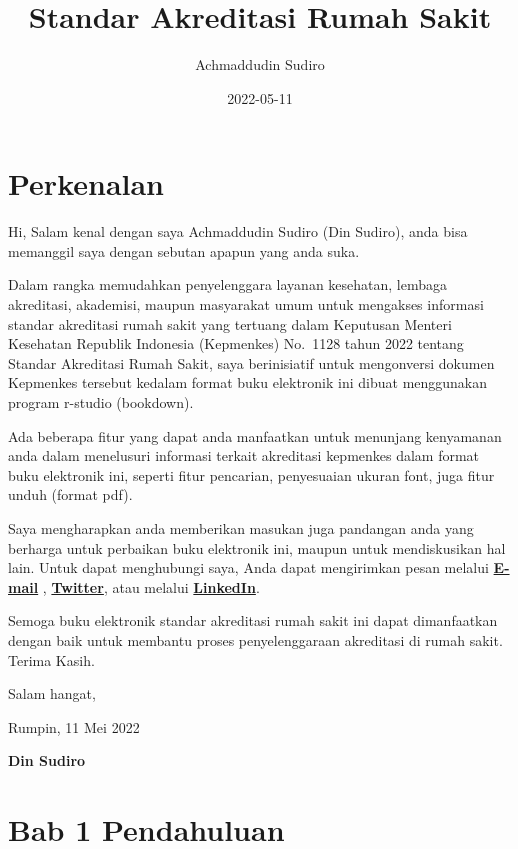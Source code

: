 \documentclass[
]{book}
\title{Standar Akreditasi Rumah Sakit}
\author{Achmaddudin Sudiro}
\date{2022-05-11}
\begin{document}
\maketitle

{
\setcounter{tocdepth}{1}
\tableofcontents
}
\hypertarget{perkenalan}{%
\chapter*{Perkenalan}\label{perkenalan}}

Hi, Salam kenal dengan saya Achmaddudin Sudiro (Din Sudiro), anda bisa memanggil saya dengan sebutan apapun yang anda suka.

Dalam rangka memudahkan penyelenggara layanan kesehatan, lembaga akreditasi, akademisi, maupun masyarakat umum untuk mengakses informasi standar akreditasi rumah sakit yang tertuang dalam Keputusan Menteri Kesehatan Republik Indonesia (Kepmenkes) No.~1128 tahun 2022 tentang Standar Akreditasi Rumah Sakit, saya berinisiatif untuk mengonversi dokumen Kepmenkes tersebut kedalam format buku elektronik ini dibuat menggunakan program r-studio (bookdown).

Ada beberapa fitur yang dapat anda manfaatkan untuk menunjang kenyamanan anda dalam menelusuri informasi terkait akreditasi kepmenkes dalam format buku elektronik ini, seperti fitur pencarian, penyesuaian ukuran font, juga fitur unduh (format pdf).

Saya mengharapkan anda memberikan masukan juga pandangan anda yang berharga untuk perbaikan buku elektronik ini, maupun untuk mendiskusikan hal lain. Untuk dapat menghubungi saya, Anda dapat mengirimkan pesan melalui \textbf{\href{mailto:achmaddudinsudiro2@gmail.com}{E-mail}} , \textbf{\href{https://mobile.twitter.com/din_sudiro}{Twitter}}, atau melalui \textbf{\href{https://www.linkedin.com/in/din-sudiro/}{LinkedIn}}.

Semoga buku elektronik standar akreditasi rumah sakit ini dapat dimanfaatkan dengan baik untuk membantu proses penyelenggaraan akreditasi di rumah sakit.
Terima Kasih.

Salam hangat,

Rumpin, 11 Mei 2022

\textbf{Din Sudiro}

\hypertarget{bab-1-pendahuluan}{%
\chapter*{Bab 1 Pendahuluan}\label{bab-1-pendahuluan}}
\end{document}

